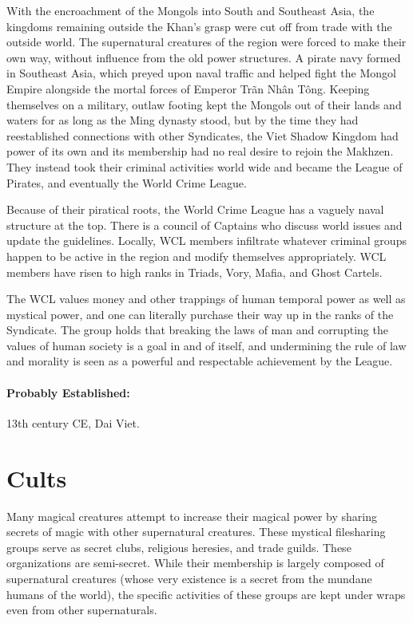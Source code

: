 With the encroachment of the Mongols into South and Southeast Asia, the kingdoms remaining outside the Khan's grasp were cut off from trade with the outside world. The supernatural creatures of the region were forced to make their own way, without influence from the old power structures. A pirate navy formed in Southeast Asia, which preyed upon naval traffic and helped fight the Mongol Empire alongside the mortal forces of Emperor Tr\~{a}n Nh\^{a}n T\^{o}ng. Keeping themselves on a military, outlaw footing kept the Mongols out of their lands and waters for as long as the Ming dynasty stood, but by the time they had reestablished connections with other Syndicates, the Viet Shadow Kingdom had power of its own and its membership had no real desire to rejoin the Makhzen. They instead took their criminal activities world wide and became the League of Pirates, and eventually the World Crime League.

Because of their piratical roots, the World Crime League has a vaguely naval structure at the top. There is a council of Captains who discuss world issues and update the guidelines. Locally, WCL members infiltrate whatever criminal groups happen to be active in the region and modify themselves appropriately. WCL members have risen to high ranks in Triads, Vory, Mafia, and Ghost Cartels. 

The WCL values money and other trappings of human temporal power as well as mystical power, and one can literally purchase their way up in the ranks of the Syndicate. The group holds that breaking the laws of man and corrupting the values of human society is a goal in and of itself, and undermining the rule of law and morality is seen as a powerful and respectable achievement by the League.

\paragraph{Probably Established:} 13th century CE, Dai Viet.

\section{Cults} 

Many magical creatures attempt to increase their magical power by sharing secrets of magic with other supernatural creatures. These mystical filesharing groups serve as secret clubs, religious heresies, and trade guilds. These organizations are semi-secret. While their membership is largely composed of supernatural creatures (whose very existence is a secret from the mundane humans of the world), the specific activities of these groups are kept under wraps even from other supernaturals. 

